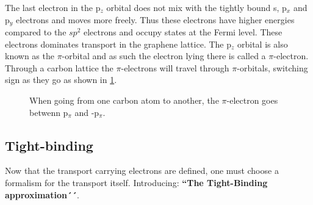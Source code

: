 The last electron in the p\(_z\) orbital does not mix with the tightly bound s, p\(_x\) and p\(_y\) electrons and moves more freely. Thus these electrons have higher energies compared to the \(sp^2\) electrons and occupy states at the Fermi level. These electrons dominates transport in the graphene lattice. The p\(_z\) orbital is also known as the \(\pi\)-orbital and as such the electron lying there is called a \(\pi\)-electron. Through a carbon lattice the \(\pi\)-electrons will travel through \(\pi\)-orbitals, switching sign as they go as shown in \cref{sign}.
\begin{figure}[H]
	\begin{center}
		\caption{When going from one carbon atom to another, the \(\pi\)-electron goes betwenn p\(_\pi\) and -p\(_\pi\).}
		\label{sign}
	\end{center}
\end{figure}
\cite{calogero_electron_2019}
\subsection{Tight-binding}
Now that the transport carrying electrons are defined, one must choose a formalism for the transport itself. Introducing: \textbf{``The Tight-Binding approximation´´}.